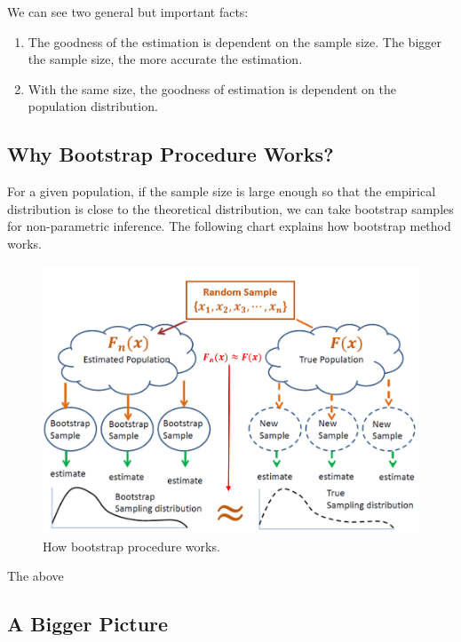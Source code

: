 \documentclass[
]{book}
\begin{document}
We can see two general but important facts:

\begin{enumerate}
\def\labelenumi{\arabic{enumi}.}
\item
  The goodness of the estimation is dependent on the sample size. The bigger the sample size, the more accurate the estimation.
\item
  With the same size, the goodness of estimation is dependent on the population distribution.
\end{enumerate}

\hypertarget{why-bootstrap-procedure-works}{%
\subsection{Why Bootstrap Procedure Works?}\label{why-bootstrap-procedure-works}}

For a given population, if the sample size is large enough so that the empirical distribution is close to the theoretical distribution, we can take bootstrap samples for non-parametric inference. The following chart explains how bootstrap method works.

\begin{figure}

{\centering \includegraphics[width=0.6\linewidth]{img05/w05-HowBootstrapWorks} 

}

\caption{How bootstrap procedure works.}\label{fig:unnamed-chunk-96}
\end{figure}

The above

\hypertarget{a-bigger-picture}{%
\subsection{A Bigger Picture}\label{a-bigger-picture}}
\end{document}
